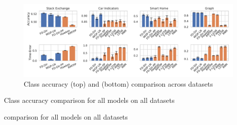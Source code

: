 \begin{figure}[H]
\centering
    \includegraphics[width=\linewidth]{images/accuracy-final-all.pdf}
    \caption{Class accuracy (top) and \TimeScore (bottom) comparison across datasets}
    \label{fig:all_results}
\end{figure}

\begin{table}
    \centering
    \caption{Class accuracy comparison for all models on all datasets}\label{table:accuracy}
    
\end{table}
\begin{table}
    \centering
    \caption{\TimeScore comparison for all models on all datasets}\label{table:time_error}
    
\end{table}




